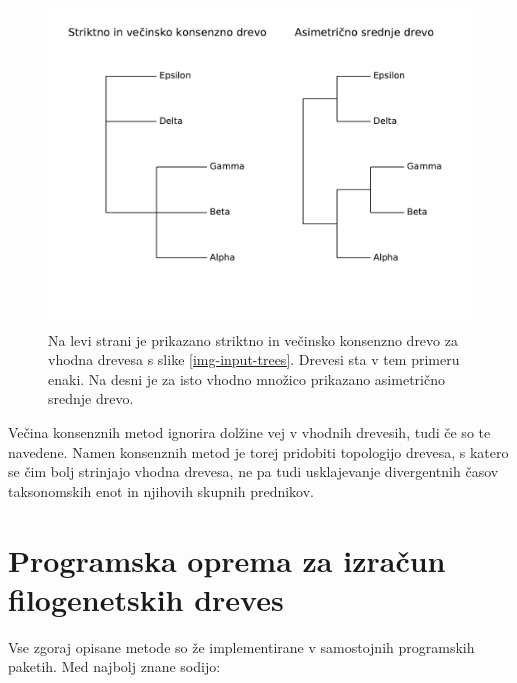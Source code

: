 \documentclass[a4paper, 12pt]{book}
\begin{document}
\begin{figure}[h!]
	\begin{center}
		\includegraphics[scale=0.65, clip=true, trim=0 3cm 0 9mm]{gfx/strict_majority_amt_ex.pdf}
	\end{center}
	\caption{
		Na levi strani je prikazano striktno in večinsko konsenzno drevo za vhodna 
		drevesa s slike \ref{img-input-trees}. Drevesi sta v tem primeru enaki. 
		Na desni je za isto vhodno množico prikazano asimetrično srednje drevo.
	}
	\label{img-strict-majority-amt-example}
\end{figure}

\noindent Večina konsenznih metod ignorira dolžine vej v vhodnih drevesih, tudi če so te navedene. 
Namen konsenznih metod je torej pridobiti topologijo drevesa, s katero se čim bolj strinjajo 
vhodna drevesa, ne pa tudi usklajevanje divergentnih časov taksonomskih enot in njihovih 
skupnih prednikov.  

\section[Programska oprema za izračun filogenetskih dreves]{Programska oprema za izračun\\ filogenetskih dreves}
Vse zgoraj opisane metode so že implementirane v samostojnih programskih paketih. Med najbolj znane sodijo:
\end{document}
